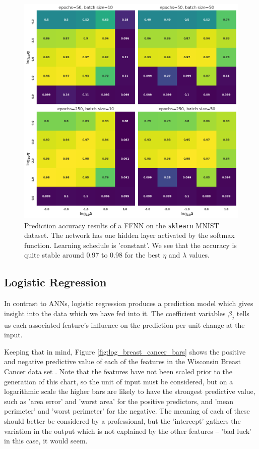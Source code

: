 \documentclass[]{article}
\begin{document}
\begin{figure}[!htb]
	\centering
	\includegraphics[width=1\linewidth]{ffnn_digits.png}
	\caption{Prediction accuracy results of a FFNN on the \lstinline|sklearn| MNIST dataset. The network has one hidden layer activated by the softmax function. Learning schedule is 'constant'. We see that the accuracy is quite stable around 0.97 to 0.98 for the best $\eta$ and $\lambda$ values.}
	\label{fig:ffnn_digits}
\end{figure}

\subsection{Logistic Regression}

In contrast to ANNs, logistic regression produces a prediction model which gives insight into the data which we have fed into it. The coefficient variables $\beta_j$ tells us each associated feature's influence on the prediction per unit change at the input. 

Keeping that in mind, Figure \ref{fig:log_breast_cancer_bars} shows the positive and negative predictive value of each of the features in the Wisconsin Breast Cancer data set \cite{skl-datasets}. Note that the features have not been scaled prior to the generation of this chart, so the unit of input must be considered, but on a logarithmic scale the higher bars are likely to have the strongest predictive value, such as 'area error' and 'worst area' for the positive predictors, and 'mean perimeter' and 'worst perimeter' for the negative. The meaning of each of these should better be considered by a professional, but the 'intercept' gathers the variation in the output which is not explained by the other features -- 'bad luck' in this case, it would seem.
\end{document}
